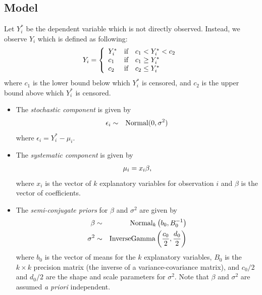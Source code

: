 \documentclass[letterpaper,10pt,english]{sphinxmanual}
\begin{document}
\subsection{Model}
\label{vignette:id114}
Let \(Y_i^*\) be the dependent variable which is not directly
observed. Instead, we observe \(Y_i\) which is defined as following:
\begin{gather}
\begin{split}Y_i = \left\{
\begin{array}{lcl}
Y_i^*  &\textrm{if} & c_1<Y_i^*<c_2 \\
c_1    &\textrm{if} & c_1 \ge Y_i^* \\
c_2    &\textrm{if} & c_2 \le Y_i^*
\end{array}\right.\end{split}\notag
\end{gather}
where \(c_1\) is the lower bound below which \(Y_i^*\) is
censored, and \(c_2\) is the upper bound above which \(Y_i^*\)
is censored.
\begin{itemize}
\item {} 
The \emph{stochastic component} is given by
\begin{gather}
\begin{split}\begin{aligned}
\epsilon_{i}  &  \sim & \textrm{Normal}(0, \sigma^2)\end{aligned}\end{split}\notag
\end{gather}
where \(\epsilon_{i}=Y^*_i-\mu_i\).

\item {} 
The \emph{systematic component} is given by
\begin{gather}
\begin{split}\begin{aligned}
\mu_{i}= x_{i} \beta,\end{aligned}\end{split}\notag
\end{gather}
where \(x_{i}\) is the vector of \(k\) explanatory variables
for observation \(i\) and \(\beta\) is the vector of
coefficients.

\item {} 
The \emph{semi-conjugate priors} for \(\beta\) and \(\sigma^2\)
are given by
\begin{gather}
\begin{split}\begin{aligned}
\beta & \sim & \textrm{Normal}_k \left( b_{0},B_{0}^{-1}\right) \\
\sigma^{2} & \sim & \textrm{InverseGamma} \left( \frac{c_0}{2}, \frac{d_0}{2}
\right) \end{aligned}\end{split}\notag
\end{gather}
where \(b_{0}\) is the vector of means for the \(k\)
explanatory variables, \(B_{0}\) is the \(k\times k\)
precision matrix (the inverse of a variance-covariance matrix), and
\(c_0/2\) and \(d_0/2\) are the shape and scale parameters
for \(\sigma^{2}\). Note that \(\beta\) and \(\sigma^2\)
are assumed \emph{a priori} independent.

\end{itemize}
\end{document}
